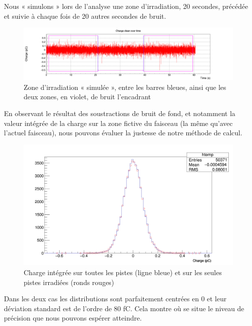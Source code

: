 \documentclass[a4paper,11pt]{article}
\begin{document}
Nous « simulons » lors de l'analyse une zone d'irradiation, 20 secondes, précédée et suivie à chaque fois de 20 autres secondes de bruit.
\begin{figure}[h]
\begin{center}
\includegraphics[scale=0.2]{Charge_clean.png} 
\caption{\label{fig:chargec}\footnotesize{Zone d'irradiation « simulée », entre les barres bleues, ainsi que les deux zones, en violet, de bruit l'encadrant}}
\end{center}
\end{figure}
En observant le résultat des soustractions de bruit de fond, et notamment la valeur intégrée de la charge sur la zone fictive du faisceau (la même qu'avec l'actuel faisceau), nous pouvons évaluer la justesse de notre méthode de calcul.
\begin{figure}[h]
\begin{center}
\includegraphics[scale=0.2]{Canvas_1.png} 
\caption{\label{fig:canvas}\footnotesize{Charge intégrée sur toutes les pistes (ligne bleue) et sur les seules pistes irradiées (ronds rouges)}}
\end{center}
\end{figure}
Dans les deux cas les distributions sont parfaitement centrées en 0 et leur déviation standard est de l'ordre de 80 fC.
Cela montre où se situe le niveau de précision que nous pouvons espérer atteindre.
\end{document}
